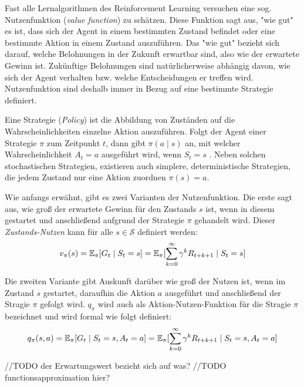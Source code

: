 Fast alle Lernalgorithmen des Reinforcement Learning versuchen eine sog. Nutzenfunktion (\textit{value function}) zu schätzen. Diese Funktion sagt aus, "wie gut" es ist, dass sich der Agent in einem bestimmten Zustand befindet oder eine bestimmte Aktion in einem Zustand auszuführen. Das "wie gut" bezieht sich darauf,
welche Belohnungen in der Zukunft erwartbar sind, also wie der erwartete Gewinn ist. Zukünftige Belohnungen sind natürlicherweise abhängig davon, wie sich der Agent verhalten bzw. welche Entscheidungen er treffen wird. Nutzenfunktion sind deshalb immer in Bezug auf eine bestimmte Strategie definiert\cite[S.~58]{Sutton1998}.
\par 
Eine Strategie (\textit{Policy}) ist die Abbildung von Zuständen auf die Wahrscheinlichkeiten einzelne Aktion auszuführen. Folgt der Agent einer Strategie $\pi$ zum Zeitpunkt $t$, dann gibt $\pi(a\mid s)$ an, mit welcher Wahrscheinlichkeit $A_t = a$ ausgeführt wird, wenn $S_t = s$ \cite[S.~58]{Sutton1998}. Neben solchen stochastischen Strategien, existieren auch simplere, deterministische Strategien, die jedem Zustand nur eine Aktion zuordnen $\pi (s) = a$. 
\par
Wie anfangs erwähnt, gibt es zwei Varianten der Nutzenfunktion. Die erste sagt aus, wie groß der erwartete Gewinn für den Zustands $s$ ist, wenn in diesem gestartet und anschließend aufgrund der Strategie $\pi$ gehandelt wird. Dieser \textit{Zustands-Nutzen} kann für alle $s \in \mathcal{S}$ definiert werden:
\begin{equation}\label{eq:valueFunction}
    v_\pi(s) = \operatorname{\mathbb{E}}_\pi[G_t \mid S_t = s] = \operatorname{\mathbb{E}}_\pi[\sum_{k=0}^\infty{\gamma^k R_{t+k+1} \mid S_t = s}]
\end{equation}

Die zweiten Variante gibt Auskunft darüber wie groß der Nutzen ist, wenn im Zustand $s$ gestartet, daraufhin die Aktion $a$ ausgeführt und anschließend der Stragie $\pi$ gefolgt wird. $q_\pi$ wird auch als Aktion-Nutzen-Funktion für die Stragie $\pi$ bezeichnet und wird formal wie folgt definiert:
\begin{equation}\label{eq:actionValueFunction}
    q_\pi(s,a) = \operatorname{\mathbb{E}}_\pi[G_t \mid S_t = s, A_t = a] = \operatorname{\mathbb{E}}_\pi[\sum_{k=0}^\infty{\gamma^k R_{t+k+1} \mid S_t = s, A_t = a}]
\end{equation}

//TODO der Erwartungswert bezieht sich auf was?
//TODO functionsapproximation hier? 